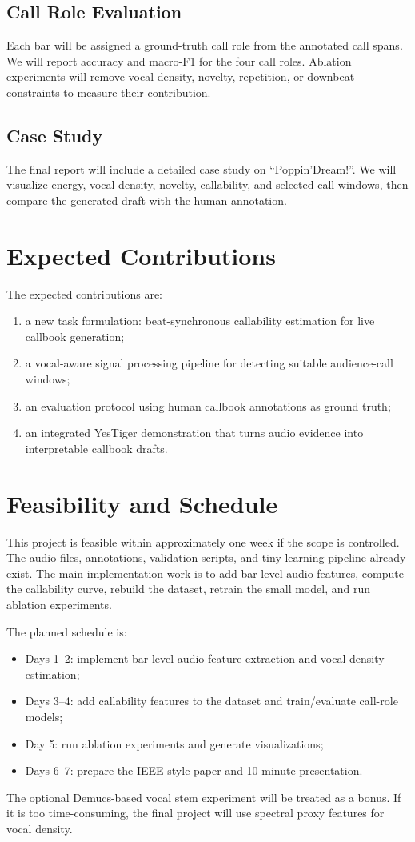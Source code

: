 \documentclass[lettersize,journal]{IEEEtran}
\begin{document}
\subsection{Call Role Evaluation}
Each bar will be assigned a ground-truth call role from the annotated call spans. We will report accuracy and macro-F1 for the four call roles. Ablation experiments will remove vocal density, novelty, repetition, or downbeat constraints to measure their contribution.

\subsection{Case Study}
The final report will include a detailed case study on ``Poppin'Dream!''. We will visualize energy, vocal density, novelty, callability, and selected call windows, then compare the generated draft with the human annotation.

\section{Expected Contributions}
The expected contributions are:
\begin{enumerate}
\item a new task formulation: beat-synchronous callability estimation for live callbook generation;
\item a vocal-aware signal processing pipeline for detecting suitable audience-call windows;
\item an evaluation protocol using human callbook annotations as ground truth;
\item an integrated YesTiger demonstration that turns audio evidence into interpretable callbook drafts.
\end{enumerate}

\section{Feasibility and Schedule}
This project is feasible within approximately one week if the scope is controlled. The audio files, annotations, validation scripts, and tiny learning pipeline already exist. The main implementation work is to add bar-level audio features, compute the callability curve, rebuild the dataset, retrain the small model, and run ablation experiments.

The planned schedule is:
\begin{itemize}
\item Days 1--2: implement bar-level audio feature extraction and vocal-density estimation;
\item Days 3--4: add callability features to the dataset and train/evaluate call-role models;
\item Day 5: run ablation experiments and generate visualizations;
\item Days 6--7: prepare the IEEE-style paper and 10-minute presentation.
\end{itemize}
The optional Demucs-based vocal stem experiment will be treated as a bonus. If it is too time-consuming, the final project will use spectral proxy features for vocal density.
\end{document}
